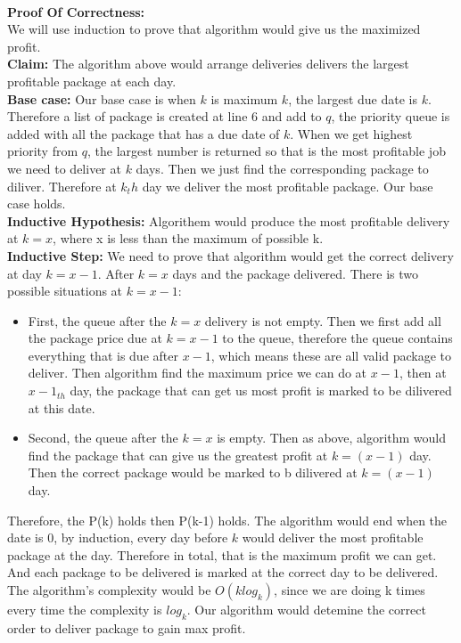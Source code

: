 \documentclass[]{article}
\begin{document}
\begin{enumerate}
\begin{minipage}{\linewidth}
\begin{algorithm}[H]
\begin{algorithmic}[1]
        \EndProcedure
      \end{algorithmic}
    \end{algorithm}
    \end{minipage}\\
    
    \textbf{Proof Of Correctness:}\\
    We will use induction to prove that algorithm would give us the maximized profit.\\
    \textbf{Claim:} The algorithm above would arrange deliveries delivers the largest
    profitable package at each day.\\
    \textbf{Base case:} Our base case is when $k$ is maximum $k$, the largest due date is $k$.
    Therefore a list of package is created at line 6 and add to $q$, the priority
    queue is added with all the package that has a due date of $k$. When we get highest
    priority from $q$, the largest number is returned so that is the most profitable
    job we need to deliver at $k$ days. Then we just find the corresponding package to
    diliver. Therefore at $k_th$ day we deliver the most profitable package. Our base case holds.\\
    \textbf{Inductive Hypothesis:} Algorithem would produce the most profitable 
    delivery at $k = x$, where x is less than the maximum of possible k. \\
    \textbf{Inductive Step:} We need to prove that algorithm would get the correct
    delivery at day $k = x-1$. After $k = x$ days and the package delivered.
    There is two possible situations at $k = x -1$:
    \begin{itemize}
      \item First, the queue after the $k = x$ delivery is not empty. Then we first
      add all the package price due at $k = x-1$ to the queue, therefore the queue
      contains everything that is due after $x-1$, which means these are all valid 
      package to deliver. Then algorithm find the maximum price we can do at $x-1$,
      then at $x-1_{th}$ day, the package that can get us most profit is marked to
      be dilivered at this date.
      \item Second, the queue after the $k = x$ is empty. Then as above, algorithm
      would find the package that can give us the greatest profit at $k = (x-1)$ day.
      Then the correct package would be marked to b dilivered at $k =(x-1)$ day.
    \end{itemize}
    Therefore, the P(k) holds then P(k-1) holds. The algorithm would end when the
    date is 0, by induction, every day before $k$ would deliver the most profitable
    package at the day. Therefore in total, that is the maximum profit we can get.
    And each package to be delivered is marked at the correct day to be delivered.
    \\
    The algorithm's complexity would be $O(klog_k)$, since we are doing k times
    every time the complexity is $log_k$. Our algorithm would detemine the correct
    order to deliver package to gain max profit.
      
    
  \end{enumerate}
\end{document}
